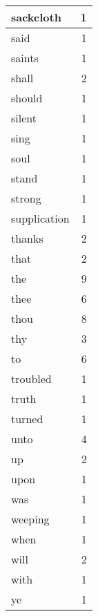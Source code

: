 \begin{center}
\begin{longtable}{l|r}
sackcloth & 1 \\ \hline
said & 1 \\ \hline
saints & 1 \\ \hline
shall & 2 \\ \hline
should & 1 \\ \hline
silent & 1 \\ \hline
sing & 1 \\ \hline
soul & 1 \\ \hline
stand & 1 \\ \hline
strong & 1 \\ \hline
supplication & 1 \\ \hline
thanks & 2 \\ \hline
that & 2 \\ \hline
the & 9 \\ \hline
thee & 6 \\ \hline
thou & 8 \\ \hline
thy & 3 \\ \hline
to & 6 \\ \hline
troubled & 1 \\ \hline
truth & 1 \\ \hline
turned & 1 \\ \hline
unto & 4 \\ \hline
up & 2 \\ \hline
upon & 1 \\ \hline
was & 1 \\ \hline
weeping & 1 \\ \hline
when & 1 \\ \hline
will & 2 \\ \hline
with & 1 \\ \hline
ye & 1 \\ \hline
\end{longtable}
\end{center}



\normalsize



